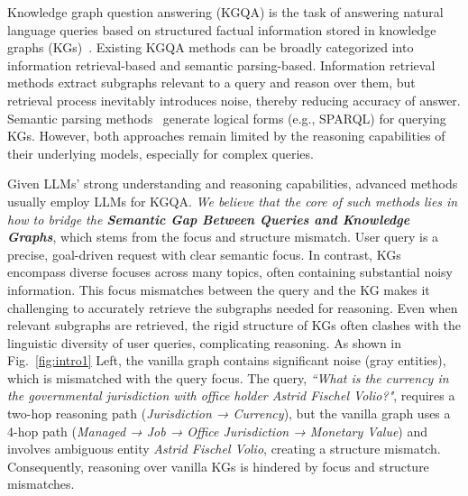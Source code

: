 \documentclass[11pt]{article}
\begin{document}
Knowledge graph question answering (KGQA) is the task of answering natural language queries based on structured factual information stored in knowledge graphs (KGs)~\cite{DBLP:conf/semweb/AuerBKLCI07,freebase}. Existing KGQA methods can be broadly categorized into information retrieval-based and semantic parsing-based.
Information retrieval~\cite{sun-etal-2019-pullnet,zhang-etal-2022-subgraph} methods extract subgraphs relevant to a query and reason over them, but retrieval process inevitably introduces noise, thereby reducing accuracy of answer. Semantic parsing methods~\cite{sun2020sparqaskeletonbasedsemanticparsing,jiang2023unikgqa} generate logical forms (e.g., SPARQL) for querying KGs. 
However, both approaches remain limited by the reasoning capabilities of their underlying models, especially for complex queries.

Given LLMs' strong understanding and reasoning capabilities, advanced methods usually employ LLMs for KGQA. 
\textit{We believe that the core of such methods lies in how to bridge the \textbf{Semantic Gap Between Queries and Knowledge Graphs}}, which stems from the focus and structure mismatch. User query is a precise, goal-driven request with clear semantic focus. In contrast, KGs encompass diverse focuses across many topics, often containing substantial noisy information. This focus mismatches between the query and the KG makes it challenging to accurately retrieve the subgraphs needed for reasoning. Even when relevant subgraphs are retrieved, the rigid structure of KGs often clashes with the linguistic diversity of user queries, complicating reasoning.
As shown in Fig.~\ref{fig:intro1} Left, the vanilla graph contains significant noise (gray entities), which is mismatched with the query focus. The query, \textit{``What is the currency in the governmental jurisdiction with office holder Astrid Fischel Volio?"}, requires a two-hop reasoning path (\textit{Jurisdiction → Currency}), but the vanilla graph uses a 4-hop path (\textit{Managed → Job → Office Jurisdiction → Monetary Value}) and involves ambiguous entity \textit{Astrid Fischel Volio}, creating a structure mismatch.
Consequently, reasoning over vanilla KGs is hindered by focus and structure mismatches. 
\end{document}
